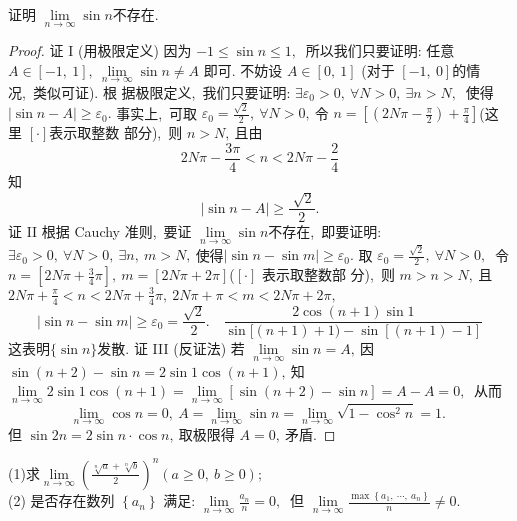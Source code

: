 \newpage
\begin{problem}
	证明 $ \lim\limits_{n\rightarrow\infty} \sin n  $不存在.
\end{problem}
\begin{proof}
	证 I (用极限定义) 因为  $-1 \leqslant \sin n \leqslant 1 ,\ $ 所以我们只要证明: 任意 $ A \in   [-1,\ 1],\  \lim\limits_{n \rightarrow \infty} \sin n \neq A $ 即可. 不妨设 $A \in$$[0,\ 1] $ (对于 $ [-1,\ 0]  $的情况,\  类似可证). 根 据极限定义,\  我们只要证明: $ \exists \varepsilon_{0}>0,\  \forall N>0,\  \exists n>N ,\ $ 使得  $|\sin n-A| \geqslant \varepsilon_{0} .$
	事实上,\  可取 $ \varepsilon_{0}=\frac{\sqrt{2}}{2},\  \forall N>0 ,\  $令  $n=\left[\left(2 N \pi-\frac{\pi}{2}\right)+\frac{\pi}{4}\right]  $(这里  $[\cdot]  $表示取整数 部分),\  则 $ n>N ,\ $且由  
	$$2 N \pi-\frac{3 \pi}{4}<n<2 N \pi-\frac{2}{4} $$
	知
	$$|\sin n- A|\geqslant\frac{\sqrt[]{2}}{2}.$$
	证 II 根据 Cauchy 准则,\  要证 $ \lim\limits_{n \rightarrow \infty} \sin n  $不存在,\  即要证明: $ \exists \varepsilon_{0}>0,\  \forall N>0 ,\   \exists n,\  m>N ,\  $使得$  |\sin n-\sin m| \geqslant \varepsilon_{0} .$
	取  $\varepsilon_{0}=\frac{\sqrt{2}}{2},\  \forall N>0 ,\ $ 令$  n=\left[2 N \pi+\frac{3}{4} \pi\right],\  m=[2 N \pi+2 \pi]$($[\cdot] $ 表示取整数部 分),\  则  $m>n>N ,\  $且 $ 2 N \pi+\frac{\pi}{4}<n<2 N \pi+\frac{3}{4} \pi,\  2 N \pi+\pi<m<2 N \pi+2 \pi ,\ $
	$$|\sin n-\sin m| \geqslant \varepsilon_{0}=\frac{\sqrt{2}}{2} . \quad \frac{2 \cos (n+1) \sin 1}{\sin [(n+1)+1)-\sin [(n+1)-1]}$$
	这表明$  \{\sin n\}  $发散.
	证 III (反证法) 若 $ \lim\limits_{n \rightarrow \infty} \sin n=A ,\  $因 $ \sin (n+2)-\sin n=2 \sin 1 \cos (n+1) ,\  $知 $ \lim\limits_{n \rightarrow \infty} 2 \sin 1 \cos (n+1)=\lim\limits_{n \rightarrow \infty}[\sin (n+2)-\sin n]=A-A=0 ,\ $ 从而
	$$\lim\limits_{n \rightarrow \infty} \cos n=0,\  A=\lim\limits_{n \rightarrow \infty} \sin n=\lim\limits_{n \rightarrow \infty} \sqrt{1-\cos ^{2} n}=1 \text {. }$$
	但  $\sin 2 n=2 \sin n \cdot \cos n ,\  $取极限得 $ A=0 ,\  $矛盾.
\end{proof}
\newpage
\begin{problem}
	(1)求$\lim\limits_{n\rightarrow\infty}\left(\frac{\sqrt[n]{a}+\sqrt[n]{b}}{2}\right)^n(a\geqslant 0,\ b\geqslant 0);$\\
	(2) 是否存在数列  $\left\{a_{n}\right\} $ 满足:  $\lim\limits_{n \rightarrow \infty} \frac{a_{n}}{n}=0 ,\ $ 但  $\lim\limits_{n \rightarrow \infty} \frac{\max \left\{a_{1},\  \cdots,\  a_{n}\right\}}{n} \neq 0 . $
\end{problem}
